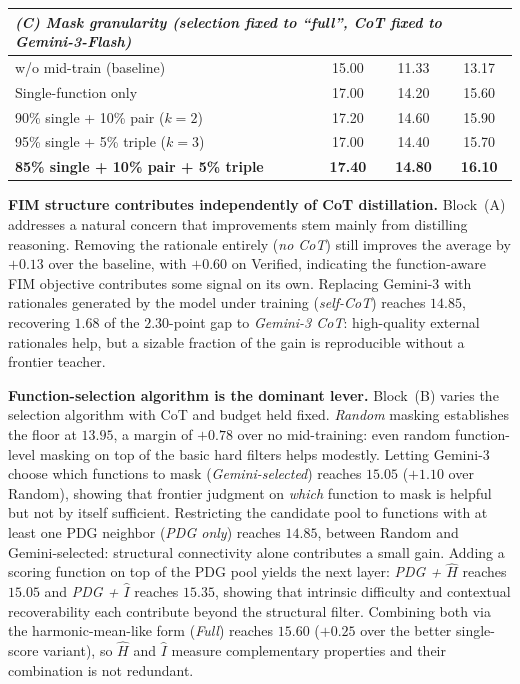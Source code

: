 \begin{table}[t]
\begin{tabular}{lccc}
\midrule
\multicolumn{4}{l}{\emph{(C) Mask granularity (selection fixed to ``full'', CoT fixed to Gemini-3-Flash)}} \\
\midrule
w/o mid-train (baseline)             & 15.00 & 11.33 & 13.17 \\
Single-function only                 & 17.00 & 14.20 & 15.60 \\
90\% single + 10\% pair ($k=2$)       & 17.20 & 14.60 & 15.90 \\
95\% single + 5\% triple ($k=3$)      & 17.00 & 14.40 & 15.70 \\
\textbf{85\% single + 10\% pair + 5\% triple} & \textbf{17.40} & \textbf{14.80} & \textbf{16.10} \\
\bottomrule
\end{tabular}
\end{table}

\textbf{FIM structure contributes independently of CoT distillation.}
Block~(A) addresses a natural concern that improvements stem
mainly from distilling reasoning. Removing the rationale entirely
(\emph{no CoT}) still improves the average by $+0.13$ over the baseline,
with $+0.60$ on Verified, indicating the function-aware FIM objective
contributes some signal on its own. Replacing Gemini-3 with rationales
generated by the model under training (\emph{self-CoT}) reaches
$14.85$, recovering $1.68$ of the $2.30$-point gap to \emph{Gemini-3
CoT}: high-quality external rationales help, but a sizable fraction of
the gain is reproducible without a frontier teacher.

\textbf{Function-selection algorithm is the dominant lever.}
Block~(B) varies the selection algorithm with CoT and budget held
fixed. \emph{Random} masking establishes the floor at $13.95$, a margin
of $+0.78$ over no mid-training: even random function-level masking on
top of the basic hard filters helps modestly. Letting Gemini-3 choose
which functions to mask (\emph{Gemini-selected}) reaches $15.05$
($+1.10$ over Random), showing that frontier judgment on \emph{which}
function to mask is helpful but not by itself sufficient. Restricting
the candidate pool to functions with at least one PDG neighbor
(\emph{PDG only}) reaches $14.85$, between Random and Gemini-selected:
structural connectivity alone contributes a small gain. Adding a
scoring function on top of the PDG pool yields the next layer:
\emph{PDG + $\hat{H}$} reaches $15.05$ and \emph{PDG + $\hat{I}$}
reaches $15.35$, showing that intrinsic difficulty and contextual
recoverability each contribute beyond the structural filter. Combining
both via the harmonic-mean-like form (\emph{Full}) reaches $15.60$
($+0.25$ over the better single-score variant), so $\hat{H}$ and
$\hat{I}$ measure complementary properties and their combination is not
redundant.

